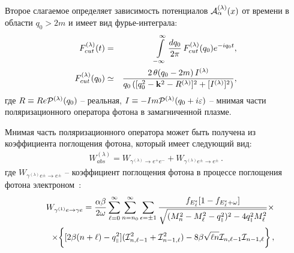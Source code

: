 \documentclass[14pt, russian]{article}
\def\mprl{\mbox{\tiny $\|$}}
\def\beq{\begin{eqnarray}}
\def\eeq{\end{eqnarray}}
\begin{document}
Второе слагаемое определяет зависимость потенциалов ${\cal A}^{(\lambda)}_\alpha(x)$ от времени
в области $q_0>2m$ и имеет вид
фурье-интеграла:
%
\begin{eqnarray}
F^{(\lambda)}_{cut}(t) &=& \int \limits_{- \infty}^{\infty} \frac{dq_0}{2 \pi}\,
F^{(\lambda)}_{cut}(q_0)e^{- i q_0 t},
\label{eq:20} 
\\
F^{(\lambda)}_{cut}(q_0) &\simeq& 
\frac{2 \,\theta (q_0  -  2 m)\,I^{(\lambda)}}
{q_0\,([ q_0^2 - {\bf k}^2 - R^{(\lambda)}]^2 + [I^{(\lambda)}]^2)},
\label{eq:21}
\end{eqnarray}
%
где $R \equiv Re {\cal P}^{(\lambda)}(q_0)$  – реальная, $I \equiv  - Im {\cal P}^{(\lambda)}(q_0 + i \varepsilon)$ – мнимая 
части поляризационного оператора фотона в замагниченной плазме.

Мнимая часть поляризационного оператора может быть получена из коэффициента  
поглощения фотона, который имеет следующий вид:
\begin{eqnarray}
W^{(\lambda)}_{abs} = W_{\gamma^{(\lambda)} \to e^+ e^-} + W_{\gamma^{(\lambda)} e^{\pm} \to e^{\pm}} \, .
\label{eq:Wabs}
\end{eqnarray}
где $W_{\gamma^{(\lambda)} e^{\pm} \to e^{\pm}}$ -- коэффициент поглощения фотона в процессе поглощения фотона электроном~\cite{Rumyantsev:2017}:
\beq
\label{eq:wabs1} 
&&W_{\gamma^{(1)} e \to \gamma e} = \frac{\alpha \beta}{2 \omega} 
\sum \limits^{\infty}_{\ell=0}  \sum \limits^{\infty}_{n=n_{0}} \sum \limits_{\epsilon = \pm 1} 
\frac{f_{E^{\epsilon}_{\ell}} [1 - f_{E^{\epsilon}_{\ell} + \omega}]}{\sqrt{(M_n^2-M_{\ell}^2-q^{2}_{\mprl})^2-4 q^{2}_{\mprl}M_{\ell}^2}}
\times 
\\
\nonumber
&&\times 
\bigg \{ [2 \beta (n+\ell) - q^{2}_{\mprl}] ({\cal I}^2_{n,\ell-1}+{\cal I}^2_{n-1,\ell}) - 
8 \beta \sqrt{\ell n} {\cal I}_{n,\ell-1} {\cal I}_{n-1,\ell} \bigg \}   \, ,
\eeq
%
\end{document}

